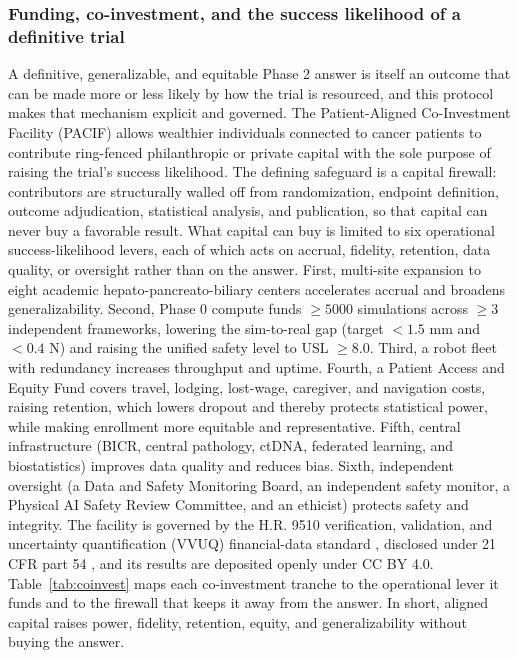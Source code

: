 \subsubsection*{Funding, co-investment, and the success likelihood of a definitive
trial}

A definitive, generalizable, and equitable Phase 2 answer is itself an outcome
that can be made more or less likely by how the trial is resourced, and this
protocol makes that mechanism explicit and governed. The Patient-Aligned
Co-Investment Facility (PACIF) allows wealthier individuals connected to cancer
patients to contribute ring-fenced philanthropic or private capital with the sole
purpose of raising the trial's success likelihood. The defining safeguard is a
capital firewall: contributors are structurally walled off from randomization,
endpoint definition, outcome adjudication, statistical analysis, and publication,
so that capital can never buy a favorable result. What capital can buy is limited
to six operational success-likelihood levers, each of which acts on accrual,
fidelity, retention, data quality, or oversight rather than on the answer. First,
multi-site expansion to eight academic hepato-pancreato-biliary centers
accelerates accrual and broadens generalizability. Second, Phase 0 compute funds
$\geq 5000$ simulations across $\geq 3$ independent frameworks, lowering the
sim-to-real gap (target $< 1.5$ mm and $< 0.4$ N) and raising the unified safety
level to USL $\geq 8.0$. Third, a robot fleet with redundancy increases throughput
and uptime. Fourth, a Patient Access and Equity Fund covers travel, lodging,
lost-wage, caregiver, and navigation costs, raising retention, which lowers
dropout and thereby protects statistical power, while making enrollment more
equitable and representative. Fifth, central infrastructure (BICR, central
pathology, ctDNA, federated learning, and biostatistics) improves data quality and
reduces bias. Sixth, independent oversight (a Data and Safety Monitoring Board, an
independent safety monitor, a Physical AI Safety Review Committee, and an
ethicist) protects safety and integrity. The facility is governed by the H.R. 9510
verification, validation, and uncertainty quantification (VVUQ) financial-data
standard \cite{kawchak2026hr9510}, disclosed under 21 CFR part 54
\cite{ecfr2026part54}, and its results are deposited openly under CC BY 4.0.
Table~\ref{tab:coinvest} maps each co-investment tranche to the operational lever
it funds and to the firewall that keeps it away from the answer. In short, aligned
capital raises power, fidelity, retention, equity, and generalizability without
buying the answer.

